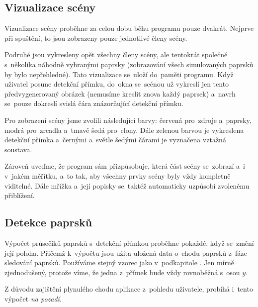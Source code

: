 \subsection{Vizualizace scény}

Vizualizace scény proběhne za celou dobu běhu programu pouze dvakrát. Nejprve při spuštění, to jsou zobrazeny pouze jednotlivé členy scény.


Podruhé jsou vykresleny opět všechny členy scény, ale tentokrát společně s~několika náhodně vybranými paprsky (zobrazování všech simulovaných paprsků by bylo nepřehledné). Tato vizualizace se~uloží do~paměti programu. Když uživatel posune detekční přímku, do~okna se~scénou už vykreslí jen tento předvygenerovaný obrázek (nemusíme kreslit znova každý paprsek) a~navrh se~pouze dokreslí svislá čára znázorňující detekční přímku.


Pro zobrazení scény jsme zvolili následující barvy: červená pro~zdroje a~paprsky, modrá pro~zrcadla a~tmavě šedá pro~clony. Dále zelenou barvou je vykreslena detekční přímka a~černými a~světle šedými čárami je vyznačena vztažná soustava.

Zároveň uveďme, že program sám přizpůsobuje, která část scény se~zobrazí a~i v~jakém měřítku, a~to tak, aby všechny prvky scény byly vždy kompletně viditelné. Dále mřížka a~její popisky se~taktéž automaticky uzpůsobí zvolenému přiblížení.

\beautypage

\subsection{Detekce paprsků}

Výpočet průsečíků paprsků s~detekční přímkou proběhne pokaždé, když se~změní její poloha. Přičemž k~výpočtu jsou užita uložená data o~chodu paprsků z~fáze sledování paprsků. Používáme stejný vzorec jako v~podkapitole . Jen mírně zjednodušený, protože víme, že jedna z~přímek bude vždy rovnoběžná s~osou $y$.

Z důvodu zajištění plynulého chodu aplikace z~pohledu uživatele, probíhá i~tento výpočet \emph{na pozadí}.

